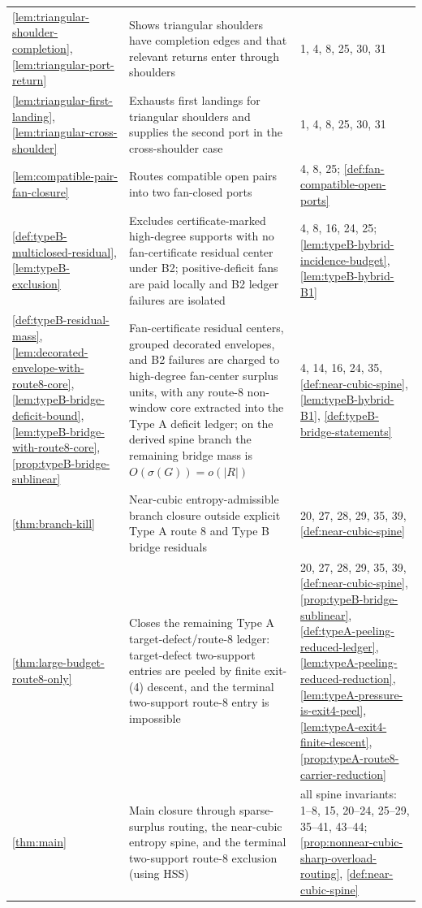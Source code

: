 \documentclass[11pt]{article}
\begin{document}
{\begin{longtable}{L{0.31\textwidth} L{0.42\textwidth} L{0.17\textwidth}}
\cref{lem:triangular-shoulder-completion}, \cref{lem:triangular-port-return} & Shows triangular shoulders have completion edges and that relevant returns enter through shoulders & 1, 4, 8, 25, 30, 31 \\
\cref{lem:triangular-first-landing}, \cref{lem:triangular-cross-shoulder} & Exhausts first landings for triangular shoulders and supplies the second port in the cross-shoulder case & 1, 4, 8, 25, 30, 31 \\
\cref{lem:compatible-pair-fan-closure} & Routes compatible open pairs into two fan-closed ports & 4, 8, 25; \cref{def:fan-compatible-open-ports} \\
\cref{def:typeB-multiclosed-residual}, \cref{lem:typeB-exclusion} & Excludes certificate-marked high-degree supports with no fan-certificate residual center under B2; positive-deficit fans are paid locally and B2 ledger failures are isolated & 4, 8, 16, 24, 25; \cref{lem:typeB-hybrid-incidence-budget}, \cref{lem:typeB-hybrid-B1} \\
\cref{def:typeB-residual-mass}, \cref{lem:decorated-envelope-with-route8-core}, \cref{lem:typeB-bridge-deficit-bound}, \cref{lem:typeB-bridge-with-route8-core}, \cref{prop:typeB-bridge-sublinear} & Fan-certificate residual centers, grouped decorated envelopes, and B2 failures are charged to high-degree fan-center surplus units, with any route-8 non-window core extracted into the Type A deficit ledger; on the derived spine branch the remaining bridge mass is $O(\sigma(G))=o(|R|)$ & 4, 14, 16, 24, 35, \cref{def:near-cubic-spine}, \cref{lem:typeB-hybrid-B1}, \cref{def:typeB-bridge-statements} \\
\cref{thm:branch-kill} & Near-cubic entropy-admissible branch closure outside explicit Type A route 8 and Type B bridge residuals & 20, 27, 28, 29, 35, 39, \cref{def:near-cubic-spine} \\
\cref{thm:large-budget-route8-only} & Closes the remaining Type A target-defect/route-8 ledger: target-defect two-support entries are peeled by finite exit-\textup{(4)} descent, and the terminal two-support route-8 entry is impossible & 20, 27, 28, 29, 35, 39, \cref{def:near-cubic-spine}, \cref{prop:typeB-bridge-sublinear}, \cref{def:typeA-peeling-reduced-ledger}, \cref{lem:typeA-peeling-reduced-reduction}, \cref{lem:typeA-pressure-is-exit4-peel}, \cref{lem:typeA-exit4-finite-descent}, \cref{prop:typeA-route8-carrier-reduction} \\
\cref{thm:main} & Main closure through sparse-surplus routing, the near-cubic entropy spine, and the terminal two-support route-8 exclusion (using HSS) & all spine invariants: 1--8, 15, 20--24, 25--29, 35--41, 43--44; \cref{prop:nonnear-cubic-sharp-overload-routing}, \cref{def:near-cubic-spine} \\
\bottomrule
\end{longtable}
}
\end{document}
